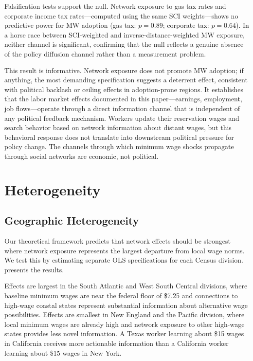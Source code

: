 \documentclass[12pt]{article}
\begin{document}


Falsification tests support the null. Network exposure to gas tax rates and corporate income tax rates---computed using the same SCI weights---shows no predictive power for MW adoption (gas tax: $p = 0.89$; corporate tax: $p = 0.64$). In a horse race between SCI-weighted and inverse-distance-weighted MW exposure, neither channel is significant, confirming that the null reflects a genuine absence of the policy diffusion channel rather than a measurement problem.

This result is informative. Network exposure does not promote MW adoption; if anything, the most demanding specification suggests a deterrent effect, consistent with political backlash or ceiling effects in adoption-prone regions. It establishes that the labor market effects documented in this paper---earnings, employment, job flows---operate through a direct information channel that is independent of any political feedback mechanism. Workers update their reservation wages and search behavior based on network information about distant wages, but this behavioral response does not translate into downstream political pressure for policy change. The channels through which minimum wage shocks propagate through social networks are economic, not political.

\section{Heterogeneity}
\label{sec:heterogeneity}

\subsection{Geographic Heterogeneity}

Our theoretical framework predicts that network effects should be strongest where network exposure represents the largest departure from local wage norms. We test this by estimating separate OLS specifications for each Census division.  presents the results.

Effects are largest in the South Atlantic and West South Central divisions, where baseline minimum wages are near the federal floor of \$7.25 and connections to high-wage coastal states represent substantial information about alternative wage possibilities. Effects are smallest in New England and the Pacific division, where local minimum wages are already high and network exposure to other high-wage states provides less novel information. A Texas worker learning about \$15 wages in California receives more actionable information than a California worker learning about \$15 wages in New York.
\end{document}
